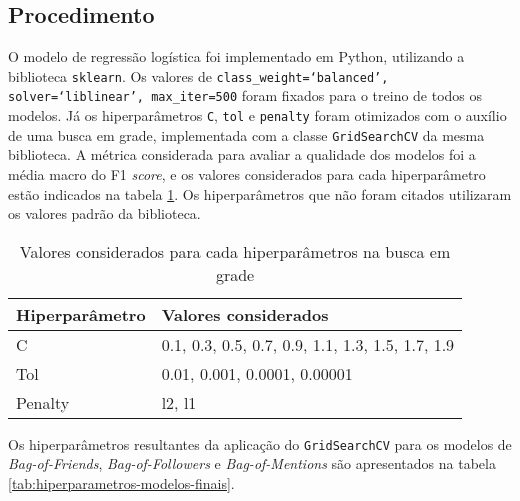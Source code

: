 \documentclass[
	12pt, oneside, a4paper, english, brazil
]{abntex2ppgsi}
\begin{document}
\subsection{Procedimento}
\label{sec:procedimento}
O modelo de regressão logística foi implementado em Python, utilizando a biblioteca \texttt{sklearn}. Os valores de \texttt{class\_weight=`balanced', solver=`liblinear', max\_iter=500} foram fixados para o treino de todos os modelos. Já os hiperparâmetros \texttt{C}, \texttt{tol} e \texttt{penalty} foram otimizados com o auxílio de uma busca em grade, implementada com a classe \texttt{GridSearchCV} da mesma biblioteca. A métrica considerada para avaliar a qualidade dos modelos foi a média macro do F1 {\em score}, e os valores considerados para cada hiperparâmetro estão indicados na tabela \ref{tab:GridSearch}. Os hiperparâmetros que não foram citados utilizaram os valores padrão da biblioteca.

\begin{table}[ht]
\centering
\caption{Valores considerados para cada hiperparâmetros na busca em grade}
\begin{tabular}{ll}
\hline
Hiperparâmetro & Valores considerados \\
\hline
C & 0.1, 0.3, 0.5, 0.7, 0.9, 1.1, 1.3, 1.5, 1.7, 1.9 \\
Tol & 0.01, 0.001, 0.0001, 0.00001 \\
Penalty & l2, l1 \\
\hline
\end{tabular}
\label{tab:GridSearch}
\end{table}

Os hiperparâmetros resultantes da aplicação do \texttt{GridSearchCV} para os modelos de {\em Bag-of-Friends}, {\em Bag-of-Followers} e {\em Bag-of-Mentions} são apresentados na tabela \ref{tab:hiperparametros-modelos-finais}.
\end{document}
